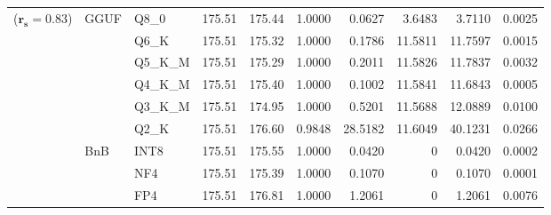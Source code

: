 \begin{longtable}{ll l rrrrrrr}
{\small ($\mathbf{r_s{=}0.83}$)} & GGUF & Q8\_0 & 175.51 & 175.44 & 1.0000 & 0.0627 & 3.6483 & 3.7110 & 0.0025 \\
 &  & Q6\_K & 175.51 & 175.32 & 1.0000 & 0.1786 & 11.5811 & 11.7597 & 0.0015 \\
 &  & Q5\_K\_M & 175.51 & 175.29 & 1.0000 & 0.2011 & 11.5826 & 11.7837 & 0.0032 \\
 &  & Q4\_K\_M & 175.51 & 175.40 & 1.0000 & 0.1002 & 11.5841 & 11.6843 & 0.0005 \\
 &  & Q3\_K\_M & 175.51 & 174.95 & 1.0000 & 0.5201 & 11.5688 & 12.0889 & 0.0100 \\
 &  & Q2\_K & 175.51 & 176.60 & 0.9848 & 28.5182 & 11.6049 & 40.1231 & 0.0266 \\
 & BnB & INT8 & 175.51 & 175.55 & 1.0000 & 0.0420 & \cellcolor{cyan!12} $0$ & 0.0420 & 0.0002 \\
 &  & NF4 & 175.51 & 175.39 & 1.0000 & 0.1070 & \cellcolor{cyan!12} $0$ & 0.1070 & 0.0001 \\
 &  & FP4 & 175.51 & 176.81 & 1.0000 & 1.2061 & \cellcolor{cyan!12} $0$ & 1.2061 & 0.0076 \\
\end{longtable}
\endgroup